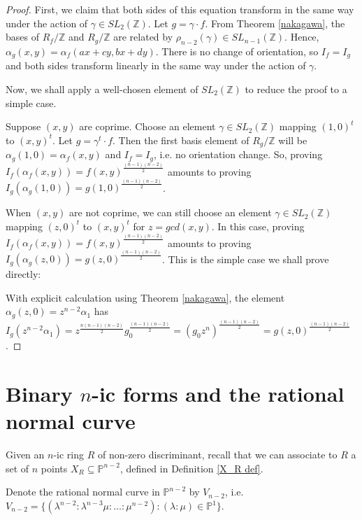 \documentclass{report}
\begin{document}
\begin{proof}
First, we claim that both sides of this equation transform in the same way under the action of $\gamma \in SL_2(\mathbb{Z})$.  Let $g = \gamma \cdot f$.  From Theorem \ref{nakagawa}, the bases of $R_f / \mathbb{Z}$ and $R_g / \mathbb{Z}$ are related by $\rho_{n-2}(\gamma) \in SL_{n-1}(\mathbb{Z})$.   Hence, $\alpha_g (x,y) = \alpha_f (ax+cy,bx+dy)$.  There is no change of orientation, so $I_f = I_g$ and both sides transform linearly in the same way under the action of $\gamma$.

Now, we shall apply a well-chosen element of $SL_2(\mathbb{Z})$ to reduce the proof to a simple case.

Suppose $(x,y)$ are coprime.  Choose an element $\gamma \in SL_2(\mathbb{Z})$ mapping $(1,0)^t$ to $(x,y)^t$.  Let $g = \gamma^t \cdot f$.  Then the first basis element of $R_g / \mathbb{Z}$ will be $\alpha_g(1,0) = \alpha_f(x,y)$ and $I_f = I_g$, i.e. no orientation change.  So, proving $I_f(\alpha_f(x,y)) = f(x,y)^{\frac{(n-1)(n-2)}{2}}$ amounts to proving $I_g(\alpha_g(1,0)) = g(1,0)^{\frac{(n-1)(n-2)}{2}}$.

When $(x,y)$ are not coprime, we can still choose an element $\gamma \in SL_2(\mathbb{Z})$ mapping $(z,0)^t$ to $(x,y)^t$ for $z = gcd(x,y)$.  In this case, proving $I_f(\alpha_f(x,y)) = f(x,y)^{\frac{(n-1)(n-2)}{2}}$ amounts to proving $I_g(\alpha_g(z,0)) = g(z,0)^{\frac{(n-1)(n-2)}{2}}$.  This is the simple case we shall prove directly:

With explicit calculation using Theorem \ref{nakagawa}, the element $\alpha_g(z,0) = z^{n-2} \alpha_1$ has $I_g( z^{n-2} \alpha_1 ) = z^\frac{n(n-1)(n-2)}{2} g_0^\frac{(n-1)(n-2)}{2} = (g_0 z^n)^\frac{(n-1)(n-2)}{2} = g(z,0)^\frac{(n-1)(n-2)}{2}$.
\end{proof}

\section{Binary $n$-ic forms and the rational normal curve}

Given an $n$-ic ring $R$ of non-zero discriminant, recall that we can associate to $R$ a set of $n$ points $X_R \subseteq \mathbb{P}^{n-2}$, defined in Definition \ref{X_R def}.

\begin{definition}
Denote the rational normal curve in $\mathbb{P}^{n-2}$ by $V_{n-2}$, i.e. $V_{n-2} = \{ ( \lambda^{n-2} : \lambda^{n-3} \mu : \ldots : \mu^{n-2} ) : ( \lambda : \mu ) \in \mathbb{P}^1 \}$.
\end{definition}
\end{document}
